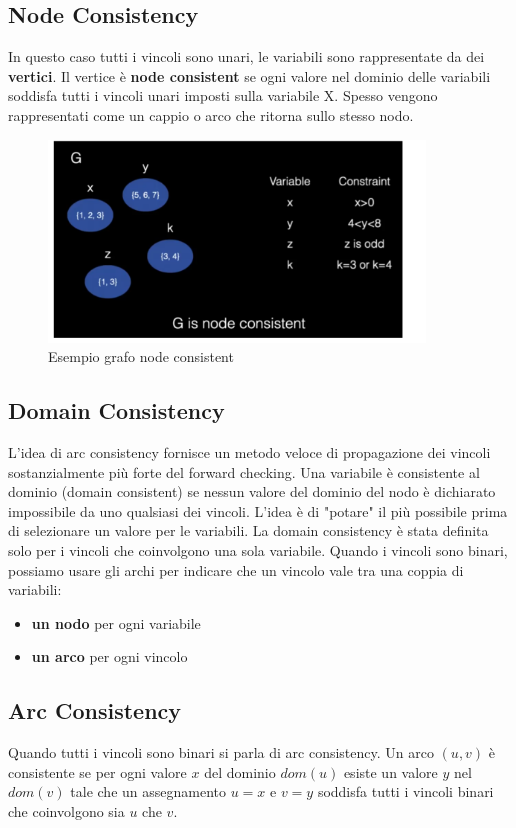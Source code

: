 \subsection{Node Consistency}
In questo caso tutti i vincoli sono unari, le variabili sono rappresentate da
dei \textbf{vertici}. Il vertice è \textbf{node consistent} se ogni valore nel
dominio delle variabili soddisfa tutti i vincoli unari imposti sulla variabile
X. Spesso vengono rappresentati come un cappio o arco che ritorna sullo stesso
nodo.
\begin{figure}[htp]
    \centering
    \includegraphics[width=10cm, keepaspectratio]{img/Cap3/node1.png}
    \caption{Esempio grafo node consistent}
\end{figure}

\subsection{Domain Consistency}
L'idea di arc consistency fornisce un metodo veloce di propagazione dei vincoli
sostanzialmente più forte del forward checking. Una variabile è consistente al
dominio (domain consistent) se nessun valore del dominio del nodo è dichiarato
impossibile da uno qualsiasi dei vincoli. L'idea è di "potare" il più possibile
prima di selezionare un valore per le variabili. La domain consistency è stata
definita solo per i vincoli che coinvolgono una sola variabile. Quando i vincoli
sono binari, possiamo usare gli archi per indicare che un vincolo vale tra una
coppia di variabili:
\begin{itemize}
    \item \textbf{un nodo} per ogni variabile
    \item \textbf{un arco} per ogni vincolo
\end{itemize}

\subsection{Arc Consistency}
Quando tutti i vincoli sono binari si parla di arc consistency. Un arco $(u,v)$ è
consistente se per ogni valore $x$ del dominio $dom(u)$ esiste un valore $y$ nel
$dom(v)$ tale che un assegnamento $u=x$ e $v=y$ soddisfa tutti i vincoli binari
che coinvolgono sia $u$ che $v$.

